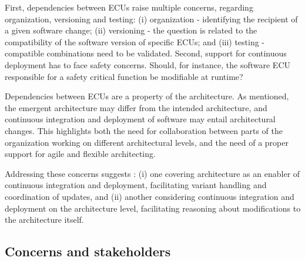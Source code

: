 First,  dependencies between ECUs raise multiple concerns,
regarding organization, versioning and testing:
(i)  organization -
identifying the recipient
of a given software change; (ii)
 versioning -
the question is related to the compatibility of the software version of specific ECUs; and
(iii)  testing -  %
compatible combinations need to be validated. 
Second, support for continuous deployment has to face  safety concerns.
Should, for instance, the software  ECU responsible for a safety critical function
be modifiable at runtime?

Dependencies between ECUs are a property of the architecture.
As mentioned, the emergent architecture may differ from the intended architecture,
and continuous integration and deployment of software may entail architectural changes.
This highlights both the need for collaboration %
between parts of the organization working on different architectural levels, and the need of a proper support
for agile and flexible architecting.

Addressing these concerns suggests :
(i) one covering architecture as an enabler
of continuous integration and deployment,
facilitating variant handling and coordination of updates, and
%
(ii) another considering continuous integration and deployment
on the architecture level,
facilitating reasoning about modifications to the architecture itself.


\subsection{Concerns and stakeholders} 
